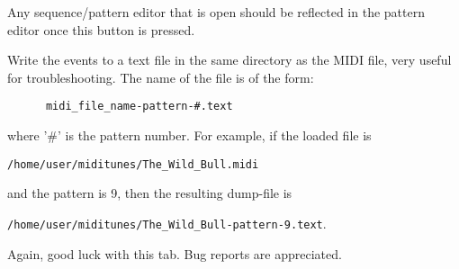    Any sequence/pattern editor that is open should be reflected
   in the pattern editor once this button is pressed.

   Write the events to a text file in the same directory as the MIDI file, very
   useful for troubleshooting.  The name of the file is of the form:

   \begin{verbatim}
      midi_file_name-pattern-#.text
   \end{verbatim}

   where '\#' is the pattern number.  For example, if the loaded file is

   \texttt{/home/user/miditunes/The\_Wild\_Bull.midi}

   and the pattern is 9, then the resulting dump-file is

   \texttt{/home/user/miditunes/The\_Wild\_Bull-pattern-9.text}.

   Again, good luck with this tab.  Bug reports are appreciated.

